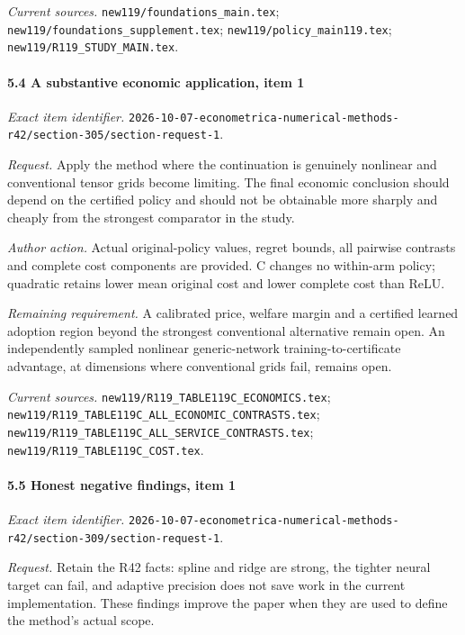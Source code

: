 \par\emph{Current sources.} \nolinkurl{new119/foundations_main.tex}; \nolinkurl{new119/foundations_supplement.tex}; \nolinkurl{new119/policy_main119.tex}; \nolinkurl{new119/R119_STUDY_MAIN.tex}.

\paragraph{5.4 A substantive economic application, item 1}

\emph{Exact item identifier.} \nolinkurl{2026-10-07-econometrica-numerical-methods-r42/section-305/section-request-1}.

\par\emph{Request.} Apply the method where the continuation is genuinely nonlinear and conventional tensor grids become limiting. The final economic conclusion should depend on the certified policy and should not be obtainable more sharply and cheaply from the strongest comparator in the study.

\par\emph{Author action.} Actual original-policy values, regret bounds, all pairwise contrasts and complete cost components are provided. C changes no within-arm policy; quadratic retains lower mean original cost and lower complete cost than ReLU.

\par\emph{Remaining requirement.} A calibrated price, welfare margin and a certified learned adoption region beyond the strongest conventional alternative remain open. An independently sampled nonlinear generic-network training-to-certificate advantage, at dimensions where conventional grids fail, remains open.

\par\emph{Current sources.} \nolinkurl{new119/R119_TABLE119C_ECONOMICS.tex}; \nolinkurl{new119/R119_TABLE119C_ALL_ECONOMIC_CONTRASTS.tex}; \nolinkurl{new119/R119_TABLE119C_ALL_SERVICE_CONTRASTS.tex}; \nolinkurl{new119/R119_TABLE119C_COST.tex}.

\paragraph{5.5 Honest negative findings, item 1}

\emph{Exact item identifier.} \nolinkurl{2026-10-07-econometrica-numerical-methods-r42/section-309/section-request-1}.

\par\emph{Request.} Retain the R42 facts: spline and ridge are strong, the tighter neural target can fail, and adaptive precision does not save work in the current implementation. These findings improve the paper when they are used to define the method's actual scope.


